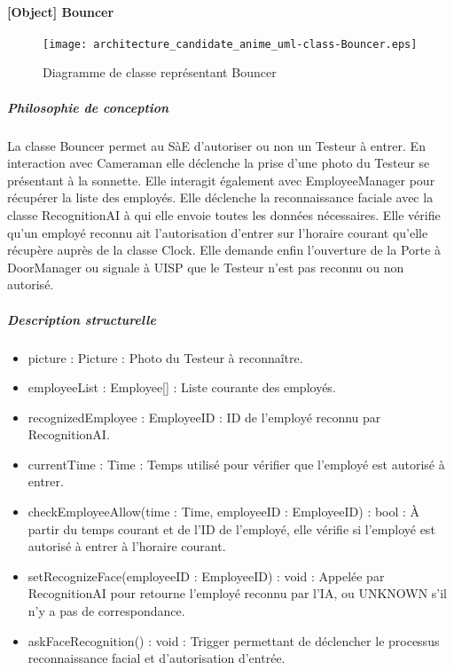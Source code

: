     \paragraph{[Object] Bouncer}%
    \begin{figure} [H]
        \centering
        \texttt{[image: architecture\_candidate\_anime\_uml-class-Bouncer.eps]}
        \caption{Diagramme de classe représentant Bouncer}
        \label{Classe_Bouncer}
    \end{figure}
        \subparagraph{Philosophie de conception}%
        La classe Bouncer permet au SàE d'autoriser ou non un Testeur à entrer.
        En interaction avec Cameraman elle déclenche la prise d'une photo du Testeur se présentant à la sonnette.
        Elle interagit également avec EmployeeManager pour récupérer la liste des employés.
        Elle déclenche la reconnaissance faciale avec la classe RecognitionAI à qui elle envoie toutes les données nécessaires.
        Elle vérifie qu'un employé reconnu ait l'autorisation d'entrer sur l'horaire courant qu'elle récupère auprès de la classe Clock.
        Elle demande enfin l'ouverture de la Porte à DoorManager ou signale à UISP que le Testeur n'est pas reconnu ou non autorisé.
        \subparagraph{Description structurelle}%
            \begin{itemize}
                \item{picture : Picture : Photo du Testeur à reconnaître.}
                \item{employeeList : Employee[] : Liste courante des employés.}
                \item{recognizedEmployee : EmployeeID : ID de l'employé reconnu par RecognitionAI.}
                \item{currentTime : Time : Temps utilisé pour vérifier que l'employé est autorisé à entrer.}
            \end{itemize}
            \begin{itemize}
                \item {checkEmployeeAllow(time : Time, employeeID : EmployeeID) : bool : À partir du temps courant et de l'ID de l'employé, elle vérifie si l'employé est autorisé à entrer à l'horaire courant.}
                \item {setRecognizeFace(employeeID : EmployeeID) : void : Appelée par RecognitionAI pour retourne l'employé reconnu par l'IA, ou UNKNOWN s'il n'y a pas de correspondance.}
                \item {askFaceRecognition() : void : Trigger permettant de déclencher le processus reconnaissance facial et d'autorisation d'entrée.}
            \end{itemize}
